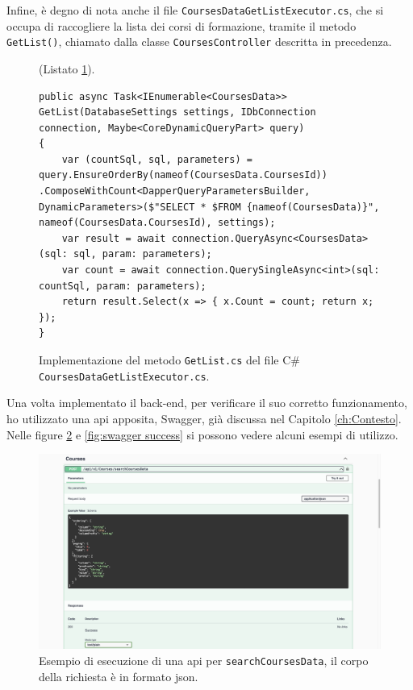 Infine, è degno di nota anche il file \texttt{CoursesDataGetListExecutor.cs}, che si occupa di raccogliere la lista dei corsi di formazione, tramite il metodo \texttt{GetList()}, chiamato dalla classe \texttt{CoursesController} descritta in precedenza.

\begin{figure}[H]
\centerline{(Listato \ref{fig:get list}).}
\begin{lstlisting}
public async Task<IEnumerable<CoursesData>> GetList(DatabaseSettings settings, IDbConnection connection, Maybe<CoreDynamicQueryPart> query)
{
    var (countSql, sql, parameters) = query.EnsureOrderBy(nameof(CoursesData.CoursesId)) .ComposeWithCount<DapperQueryParametersBuilder, DynamicParameters>($"SELECT * $FROM {nameof(CoursesData)}", nameof(CoursesData.CoursesId), settings);
    var result = await connection.QueryAsync<CoursesData>(sql: sql, param: parameters);
    var count = await connection.QuerySingleAsync<int>(sql: countSql, param: parameters);
    return result.Select(x => { x.Count = count; return x; });
}
\end{lstlisting}
\caption{\label{fig:get list}Implementazione del metodo \texttt{GetList.cs} del file C\#  \texttt{CoursesDataGetListExecutor.cs}.}
\end{figure}

Una volta implementato il back-end, per verificare il suo corretto funzionamento, ho utilizzato una \acrshort{api} apposita, Swagger, già discussa nel Capitolo \ref{ch:Contesto}. Nelle figure \ref{fig:swagger courses} e \ref{fig:swagger success} si possono vedere alcuni esempi di utilizzo.

\begin{figure}[H]
\centering
\includegraphics[width=1\textwidth]{Images/swagger courses.jpg}
\caption{\label{fig:swagger courses}Esempio di esecuzione di una \acrshort{api} per \texttt{searchCoursesData}, il corpo della richiesta è in formato \acrshort{json}.}
\end{figure}

